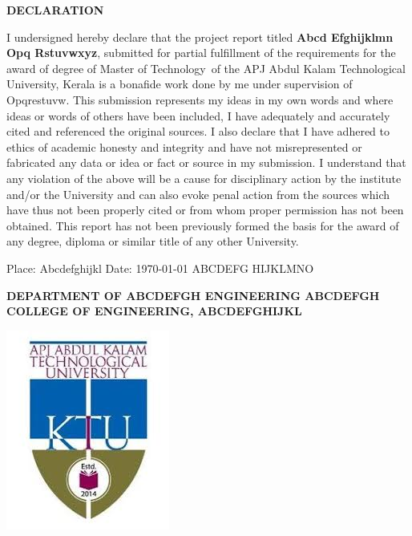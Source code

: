 \documentclass[12pt,a4paper]{report}
\def \reptitle{Abcd Efghijklmn Opq Rstuvwxyz}
\def \repauthor{ABCDEFG HIJKLMNO}
\def \repdegree{Master of Technology}
\def \repbranch{Abcdefgh Engineering}
\def \repcollege{Abcdefgh College Of Engineering}
\def \repplace{Abcdefghijkl}
\def \repsupervisor{Opqrestuvw}
\def \repuniversity{APJ Abdul Kalam Technological University}
\begin{document}


\clearpage
{}

\center\textbf{\Large DECLARATION}
\break

\justify 
{}I undersigned hereby declare that the project report titled \textbf{\reptitle}, submitted for partial fulfillment of the requirements for the award of degree of \repdegree\, of the \repuniversity, Kerala is a bonafide work done by me under supervision of \repsupervisor. This submission represents my ideas in my own words and where ideas or words of others have been included, I have adequately and accurately cited and referenced the original sources. I also declare that I have adhered to ethics of academic honesty and integrity and have not misrepresented or fabricated any data or idea or fact or source in my submission. I understand that any violation of the above will be a cause for disciplinary action by the institute and/or the University and can also evoke penal action from the sources which have thus not been properly cited or from whom proper permission has not been obtained. This report has not been previously formed the basis for the award of any degree, diploma or similar title of any other University. 

\vspace{5cm} %
\begin{flushleft}                           
Place: \repplace \break
Date: \today 
\hfill \repauthor %
\end{flushleft}

\newpage 

\center\textbf{\large \MakeUppercase{department of \repbranch } \break
\MakeUppercase{\repcollege, \repplace}}

\includegraphics[height=0.3\textwidth]{ktu_logo}\par 
\end{document}

